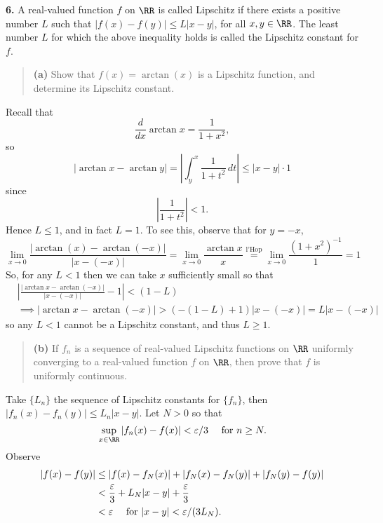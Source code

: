 \documentclass{homework}
\begin{document}
{\bf 6.} A real-valued function $f$ on $\RR$ is called Lipschitz if there exists a positive number $L$ such that $|f(x) - f(y)|\le L|x-y|$, for all $x,y\in\RR$.  The least number $L$ for which the above inequality holds is called the Lipschitz constant for $f$.

\begin{quote}
  {\bf (a)} Show that $f(x) = \arctan(x)$ is a Lipschitz function, and determine its Lipschitz constant.
\end{quote}

\begin{solution}
  Recall that 
  $$
    \frac d{dx} \arctan x = \frac 1{1+x^2},
  $$
  so
  $$
    |\arctan x - \arctan y| = \left| \int_y^x \frac 1{1+t^2}\,dt \right| \le |x-y|\cdot 1
  $$
  since
  $$
    \left|\frac 1{1+t^2}\right| < 1.
  $$
  Hence $L \le 1$, and in fact $L=1$.  To see this, observe that for $y=-x$,
  $$
    \lim_{x\to 0} \frac{|\arctan(x) - \arctan(-x)|}{|x-(-x)|} = \lim_{x\to 0} \frac{\arctan x}{x} \stackrel{\text{l'Hop}}= \lim_{x\to 0} \frac{(1+x^2)^{-1}}{1} = 1
  $$
  So, for any $L<1$ then we can take $x$ sufficiently small so that 
  \begin{align*}
    &\left|\frac{|\arctan x - \arctan(-x)|}{|x-(-x)|} - 1\right| < (1-L) \\
    &\implies |\arctan x - \arctan(-x)| > (-(1-L) + 1)|x-(-x)| = L|x-(-x)|
  \end{align*}
  so any $L<1$ cannot be a Lipschitz constant, and thus $L\ge 1$.
\end{solution}

\begin{quote}
  {\bf (b)} If $f_n$ is a sequence of real-valued Lipschitz functions on $\RR$ uniformly converging to a real-valued function $f$ on $\RR$, then prove that $f$ is uniformly continuous.
\end{quote}

\begin{solution}
  Take $\{L_n\}$ the sequence of Lipschitz constants for $\{f_n\}$, then $|f_n(x) - f_n(y)| \le L_n|x-y|$. Let $N>0$ so that 
  $$
    \sup_{x\in\RR}|f_n(x) - f(x)| < \eps/3
    \quad\text{ for }n\ge N. 
  $$
  Observe
  \begin{align*}
    |f(x) - f(y)| 
    &\le |f(x) - f_N(x)| + |f_N(x) - f_N(y)| + |f_N(y) - f(y)|\\
    &< \frac {\varepsilon}3 + L_N|x-y| + \frac {\varepsilon}3\\
    &<\varepsilon\quad\text{ for }|x-y|< \varepsilon/(3L_N).
  \end{align*}
\end{solution}
\end{document}
